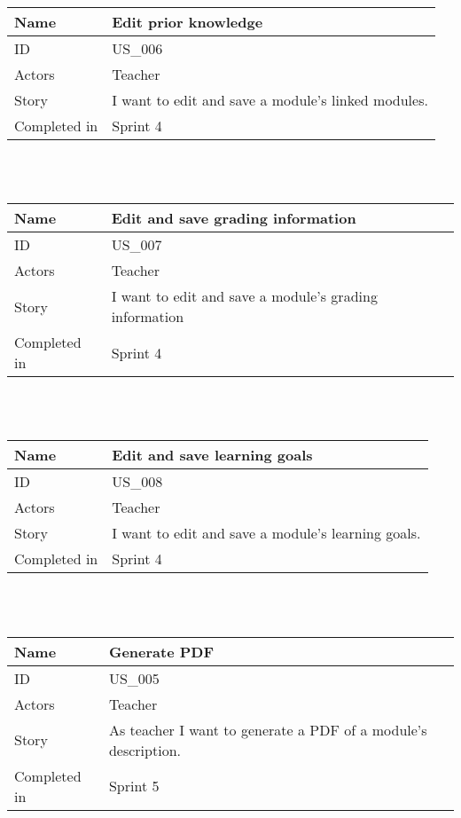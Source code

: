 \documentclass[12pt, a4paper]{article}
\newcommand\addrow[2]{#1 &#2\\ }
\newcommand\tabularhead{\begin{tabular}{lp{8cm}}
		\hline
	}
\newenvironment{usecase}{\tabularhead}
	{\hline\end{tabular}}
\begin{document}
	    \begin{usecase}
		\addrow{Name}{Edit prior knowledge}
		\hline
		\addrow{ID}{US\_006}
		\hline
		\addrow{Actors}{ Teacher }
		\hline		
		\addrow{Story}{I want to edit and save a module's linked modules.}
		\hline
		\addrow{Completed in}{Sprint 4}
	\end{usecase}
	
	~\\
	~\\
	
	    \begin{usecase}
		\addrow{Name}{Edit and save grading information}
		\hline
		\addrow{ID}{US\_007}
		\hline
		\addrow{Actors}{ Teacher }
		\hline		
		\addrow{Story}{I want to edit and save a module's grading information}
		\hline
		\addrow{Completed in}{Sprint 4}
	\end{usecase}
	
	~\\
	~\\
	
	    \begin{usecase}
		\addrow{Name}{Edit and save learning goals}
		\hline
		\addrow{ID}{US\_008}
		\hline
		\addrow{Actors}{ Teacher }
		\hline		
		\addrow{Story}{I want to edit and save a module's learning goals.}
		\hline
		\addrow{Completed in}{Sprint 4}
	\end{usecase}

	
	~\\
	~\\
	
		    \begin{usecase}
		\addrow{Name}{Generate PDF}
		\hline
		\addrow{ID}{US\_005}
		\hline
		\addrow{Actors}{ Teacher }
		\hline		
		\addrow{Story}{As teacher I want to generate a PDF of a module's description.}
		\hline
		\addrow{Completed in}{Sprint 5}
	\end{usecase}
	
    
\end{document}
